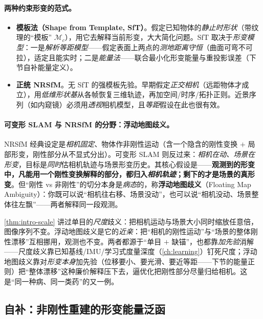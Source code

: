 \paragraph{两种约束形变的范式。}
\begin{itemize}
  \item \textbf{模板法（Shape from Template, SfT）}。假定已知物体的\emph{静止时形状}（带纹理的“模板” $\mathcal{M}_c$），用它去解释当前形变，大大简化问题。SfT 取决于\emph{形变模型}：一是\emph{解析等距模型}——假定表面上两点的\emph{测地距离守恒}（曲面可弯不可拉），适定且能实时；二是\emph{能量法}——联合最小化形变能量与重投影误差（下节自补能量定义）。
  \item \textbf{正统 NRSfM}。无 SfT 的强模板先验。早期假定\emph{正交相机}（远距物体才成立），用\emph{低维形状基}从各帧恢复三维轨迹，再加空间/时序/拓扑正则。近景序列（如内窥镜）必须用\emph{透视}相机模型，且\emph{等距}假设在此也很有效。
\end{itemize}

\paragraph{可变形 SLAM 与 NRSfM 的分野：浮动地图歧义。}
NRSfM 经典设定是\emph{相机固定}、物体作非刚性运动（含一个隐含的刚性变换 $+$ 局部形变，刚性部分从不显式分出）。可变形 SLAM 则反过来：\emph{相机在动、场景在形变}，目标是\emph{同时}估相机轨迹与场景形变历史。其核心假设是——\textbf{观测到的形变中，凡能用一个刚性变换解释的部分，都归入\emph{相机轨迹}；剩下的才是场景的真形变}\cite{schmid2026dynamic}。但“刚性 vs 非刚性”的切分本身是\emph{病态}的，称\textbf{浮动地图歧义}（Floating Map Ambiguity）：你既可以说“相机往右移、场景没动”，也可以说“相机没动、场景整体往左飘”——两者解释同一段观测。

\begin{insight}[浮动地图歧义 $=$ 尺度歧义的“非刚性版”]
\cref{thm:intro-scale} 讲过单目的\emph{尺度}歧义：把相机运动与场景大小同时缩放任意倍，图像序列不变。浮动地图歧义是它的\emph{近亲}：把“相机的刚性运动”与“场景的整体刚性漂移”互相挪用，观测也不变。两者都源于“单目 $+$ 缺锚”，也都靠\emph{加先验}消解——尺度歧义靠已知基线/IMU/学习式度量深度（\cref{ch:learning}）钉死尺度；浮动地图歧义靠对\emph{形变本身}加先验（位移要小、要光滑、要近等距——下节的能量正则）把“整体漂移”这种廉价解释压下去，逼优化把刚性部分尽量归给相机。这是“同一种病、同一类药”的又一例。
\end{insight}

\subsection{自补：非刚性重建的形变能量泛函}
\label{sec:dynamic-energy}

